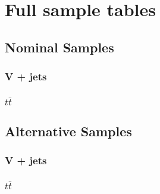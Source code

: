 \chapter{Full sample tables}
\label{app:full-nominal-samples}
\section{Nominal Samples}
\subsection{V + jets}



\subsection{\texorpdfstring{$t\bar{t}$}{tt}}

\section{Alternative Samples}
\subsection{V + jets}


\subsection{\texorpdfstring{$t\bar{t}$}{tt}}
